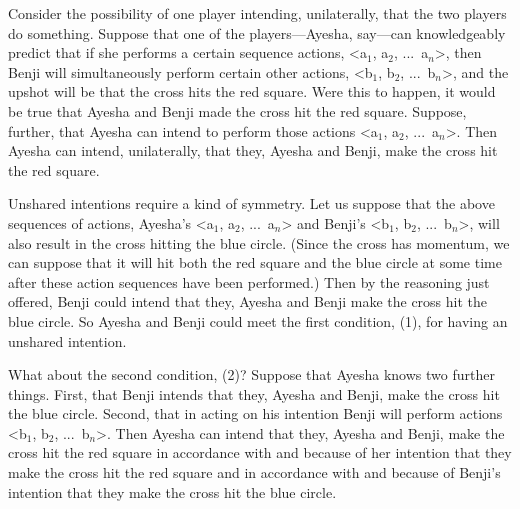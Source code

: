 \documentclass[12pt,\papersize]{extarticle}
\begin{document}
Consider the possibility of one player intending, unilaterally, that the two players do something.
Suppose that one of the players---Ayesha, say---can knowledgeably predict that if she performs a certain sequence actions, <a$_1$, a$_2$, ...\ a$_n$>, then Benji will simultaneously perform certain other actions, <b$_1$, b$_2$, ...\ b$_n$>,
 and the upshot will be that the cross hits the red square.
Were this to happen, it would be true that Ayesha and Benji made the cross hit the red square.
Suppose, further, that Ayesha can intend to perform those actions <a$_1$, a$_2$, ...\ a$_n$>.
Then Ayesha can intend, unilaterally, that they, Ayesha and Benji, make the cross hit the red square.

Unshared intentions require a kind of symmetry.
Let us suppose that the above sequences of actions,
	Ayesha's <a$_1$, a$_2$, ...\ a$_n$>  and 
	Benji's <b$_1$, b$_2$, ...\ b$_n$>,
will also result in the cross hitting the blue circle. 
(Since the cross has momentum, we can suppose that it will hit both the red square and the blue circle at some time after these action sequences have been performed.)
Then by the reasoning just offered, Benji could intend that they, Ayesha and Benji make the cross hit the blue circle.
So Ayesha and Benji could meet the first condition, (1), for having an unshared intention.

What about the second condition, (2)?
Suppose that Ayesha knows two further things.
First, that Benji intends that they, Ayesha and Benji, make the cross hit the blue circle.
Second, that in acting on his intention Benji will perform actions <b$_1$, b$_2$, ...\ b$_n$>.
Then Ayesha can intend that they, Ayesha and Benji, make the cross hit the red square in accordance with and because of her intention that they make the cross hit the red square and in accordance with and because of Benji's intention that they make the cross hit the blue circle.
\end{document}
